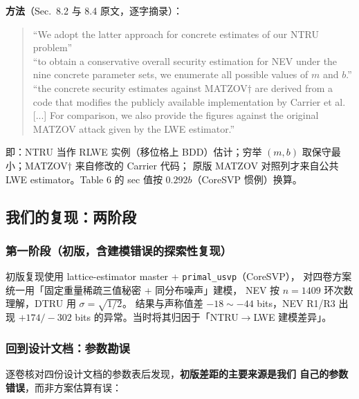 \documentclass[11pt,a4paper]{ctexart}
\begin{document}
\textbf{方法}（Sec.~8.2 与 8.4 原文，逐字摘录）：
\begin{quote}\small
``We adopt the latter approach for concrete estimates of our NTRU problem''\\[0.3em]
``to obtain a conservative overall security estimation for NEV under the nine concrete parameter sets, we enumerate all possible values of $m$ and $b$.''\\[0.3em]
``the concrete security estimates against MATZOV$\dagger$ are derived from a code that modifies the publicly available implementation by Carrier et al. [...] For comparison, we also provide the figures against the original MATZOV attack given by the LWE estimator.''
\end{quote}
即：NTRU 当作 RLWE 实例（移位格上 BDD）估计；穷举 $(m, b)$
取保守最小；MATZOV$\dagger$ 来自修改的 Carrier 代码；
原版 MATZOV 对照列才来自公共 LWE estimator。Table 6 的
sec 值按 $0.292b$（CoreSVP 惯例）换算。

\subsection{我们的复现：两阶段}

\subsubsection{第一阶段（初版，含建模错误的探索性复现）}

初版复现使用 lattice-estimator master + \texttt{primal\_usvp}（CoreSVP），
对四卷方案统一用「固定重量稀疏三值秘密 + 同分布噪声」建模，
NEV 按 $n{=}1409$ 环次数理解，DTRU 用 $\sigma{=}\sqrt{1/2}$。
结果与声称值差 $-18 \sim -44$ bits，NEV R1/R3 出现
$+174/-302$ bits 的异常。当时将其归因于「NTRU$\to$LWE 建模差异」。

\subsubsection{回到设计文档：参数勘误}

逐卷核对四份设计文档的参数表后发现，\textbf{初版差距的主要来源是我们
自己的参数错误}，而非方案估算有误：
\end{document}
